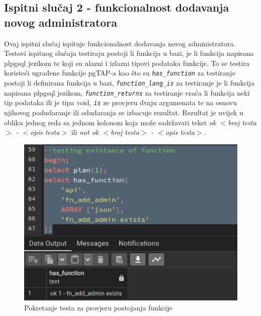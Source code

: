 				\subsection{Ispitni slučaj 2 - funkcionalnost dodavanja novog administratora}
				Ovaj ispitni slučaj ispituje funkcionalnost dodavanja novog administratora. Testovi ispitnog slučaja testiraju postoji li funkcija u bazi, je li funkcija napisana plpgsql jezikom te koji su ulazni i izlazni tipovi podataka funkcije. To se testira koristeći ugrađene funkcije pgTAP-a kao što su \textit{\texttt{has\_function}} za testiranje postoji li definirana funkcija u bazi, \textit{\texttt{function\_lang\_is}} za testiranje je li funkcija napisana plpgsql jezikom, \textit{\texttt{function\_returns}} za testiranje vraća li funkcija neki tip podataka ili je tipa void, \textit{\texttt{is\(\)}} ze provjeru dvaju argumenata te na osnovu njihovog podudaranje ili odudaranja se izbacuje rezultat. Rezultat je uvijek u obliku jednog reda sa jednom kolonom koja može sadržavati tekst \textit{ok $<$broj testa$>$ - $<$opis testa$>$} ili \textit{not ok $<$broj testa$>$ - $<$opis testa$>$}.
				\begin{figure}[H]
					\centering
					\includegraphics[width=\textwidth]{slike/unit_tests/ut_2/has_func.png}
					\caption{Pokretanje testa za provjeru postojanja funkcije}
					\label{fig: IS2-has_function}
				\end{figure}
